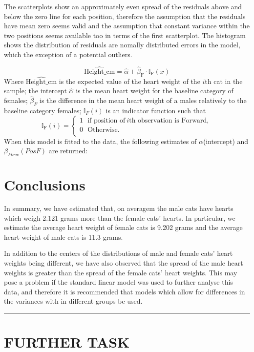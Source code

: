 \documentclass[
]{article}
\begin{document}
The scatterplots show an approximately even spread of the residuals
above and below the zero line for each position, therefore the
assumption that the residuals have mean zero seems valid and the
assumption that constant variance within the two positions seems
available too in terms of the first scatterplot. The histogram shows the
distribution of residuals are nomally distributed errors in the model,
which the exception of a potential outliers.

\[\widehat{\mbox{Height_cm}} = \widehat{\alpha} + \widehat{\beta}_{\mbox{F}} \cdot \mathbb{I}_{\mbox{F}}(x)\]
Where \(\widehat{\mbox{Height_cm}}\) is the expected value of the heart
weight of the \(i\)th cat in the sample; the intercept
\(\widehat{\alpha}\) is the mean heart weight for the baseline category
of females; \(\widehat{\beta}_{F}\) is the difference in the mean heart
weight of a males relatively to the baseline category females;
\(\mathbb{I}_{F}(i)\) is an indicator function such that
\[\mathbb{I}_{\mbox{F}}(i)=\left\{
  \begin{array}{ll}
  1 ~~~ \mbox{if position of} ~ i \mbox{th observation is Forward},\\
  0 ~~~ \mbox{Otherwise}.\\
  \end{array}
  \right.\] When this model is fitted to the data, the following
estimates of \(\alpha\)(intercept) and \(\beta_{Forw}(PosF)\) are
returned:

\hypertarget{sec:Conc}{%
\section{Conclusions}\label{sec:Conc}}

In summary, we have estimated that, on averagem the male cats have
hearts which weigh 2.121 grams more than the female cats' hearts. In
particular, we estimate the average heart weight of female cats is 9.202
grams and the average heart weight of male cats is 11.3 grams.

In addition to the centers of the distributions of male and female cats'
heart weights being different, we have also observed that the spread of
the male heart weights is greater than the spread of the female cats'
heart weights. This may pose a problem if the standard linear model was
used to further analyse this data, and therefore it is recommended that
models which allow for differences in the variances with in different
groups be used.

\begin{center}\rule{0.5\linewidth}{0.5pt}\end{center}

\newpage

\hypertarget{further-task}{%
\section{FURTHER TASK}\label{further-task}}
\end{document}
